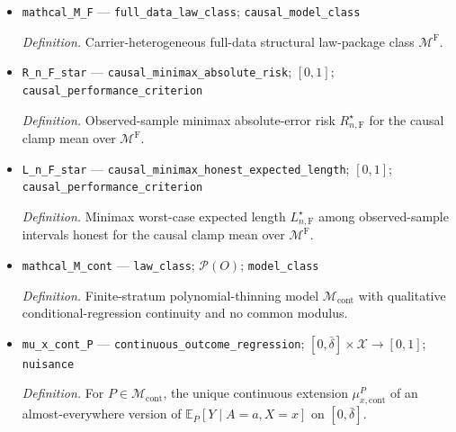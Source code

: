 \documentclass{article}
\begin{document}
\begin{itemize}
  \par\smallskip\noindent\emph{Definition.} For a fixed full-data law package, the fiberwise response mean \(m_x^{\mathrm F}(a)=\mathbb E_{P^{\mathrm F}}[g_x(a,U)\mid X=x]\), computed using that member's carrier and law.
  \item \texttt{mathcal\_\allowbreak{}M\_\allowbreak{}F} --- \texttt{full\_\allowbreak{}data\_\allowbreak{}law\_\allowbreak{}class}; \texttt{causal\_\allowbreak{}model\_\allowbreak{}class}
  \par\smallskip\noindent\emph{Definition.} Carrier-heterogeneous full-data structural law-package class \(\mathcal M^{\mathrm F}\).
  \item \texttt{R\_\allowbreak{}n\_\allowbreak{}F\_\allowbreak{}star} --- \texttt{causal\_\allowbreak{}minimax\_\allowbreak{}absolute\_\allowbreak{}risk}; \([0,1]\); \texttt{causal\_\allowbreak{}performance\_\allowbreak{}criterion}
  \par\smallskip\noindent\emph{Definition.} Observed-sample minimax absolute-error risk \(R_{n,\mathrm F}^\star\) for the causal clamp mean over \(\mathcal M^{\mathrm F}\).
  \item \texttt{L\_\allowbreak{}n\_\allowbreak{}F\_\allowbreak{}star} --- \texttt{causal\_\allowbreak{}minimax\_\allowbreak{}honest\_\allowbreak{}expected\_\allowbreak{}length}; \([0,1]\); \texttt{causal\_\allowbreak{}performance\_\allowbreak{}criterion}
  \par\smallskip\noindent\emph{Definition.} Minimax worst-case expected length \(L_{n,\mathrm F}^\star\) among observed-sample intervals honest for the causal clamp mean over \(\mathcal M^{\mathrm F}\).
  \item \texttt{mathcal\_\allowbreak{}M\_\allowbreak{}cont} --- \texttt{law\_\allowbreak{}class}; \(\mathcal P(O)\); \texttt{model\_\allowbreak{}class}
  \par\smallskip\noindent\emph{Definition.} Finite-stratum polynomial-thinning model \(\mathcal M_{\mathrm{cont}}\) with qualitative conditional-regression continuity and no common modulus.
  \item \texttt{mu\_\allowbreak{}x\_\allowbreak{}cont\_\allowbreak{}P} --- \texttt{continuous\_\allowbreak{}outcome\_\allowbreak{}regression}; \([0,\bar\delta]\times\mathcal X\to[0,1]\); \texttt{nuisance}
  \par\smallskip\noindent\emph{Definition.} For \(P\in\mathcal M_{\mathrm{cont}}\), the unique continuous extension \(\mu_{x,\mathrm{cont}}^P\) of an almost-everywhere version of \(\mathbb E_P[Y\mid A=a,X=x]\) on \([0,\bar\delta]\).

\end{itemize}
\end{document}
